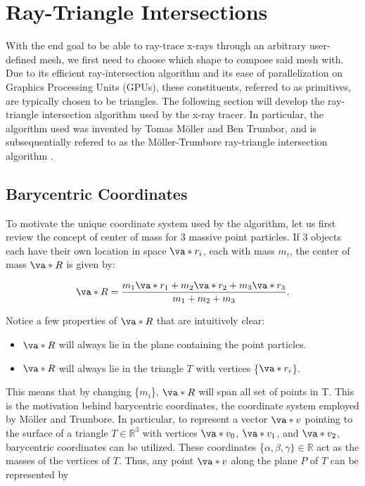 \section{Ray-Triangle Intersections}
\par With the end goal to be able to ray-trace x-rays through an arbitrary user-defined mesh, we first need to choose which shape to compose said mesh with. Due to its efficient ray-intersection algorithm and its ease of parallelization on Graphics Processing Units (GPUs), these constituents, referred to as primitives, are typically chosen to be triangles. The following section will develop the ray-triangle intersection algorithm used by the x-ray tracer. In particular, the algorithm used was invented by Tomas Möller and Ben Trumbor, and is subsequentially refered to as the Möller-Trumbore ray-triangle intersection algorithm \cite{moller2005fast}. 

\subsection{Barycentric Coordinates}
\par To motivate the unique coordinate system used by the algorithm, let us first review the concept of center of mass for 3 massive point particles. If 3 objects each have their own location in space $\va*{r_i}$, each with mass $m_i$, the center of mass $\va*{R}$ is given by:

\begin{equation}
  \va*{R} = \frac{m_1 \va*{r_1} + m_2 \va*{r_2} + m_3 \va*{r_3}}{m_1 + m_2 + m_3}.
  \label{eq:com}
\end{equation}

Notice a few properties of $\va*{R}$ that are intuitively clear:

\begin{itemize}
\item $\va*{R}$ will always lie in the plane containing the point particles.
\item $\va*{R}$ will always lie in the triangle $T$ with vertices \{$\va*{r_i}$\}.
\end{itemize}

\noindent This means that by changing \{$m_i$\}, $\va*{R}$ will span all set of points in T. This is the motivation behind barycentric coordinates, the coordinate system employed by Möller and Trumbore. In particular, to represent a vector $\va*{v}$ pointing to the surface of a triangle $T \in \mathbb{R}^3$ with vertices $\va*{v_0}$, $\va*{v_1}$, and $\va*{v_2}$, barycentric coordinates can be utilized. These coordinates \{$\alpha, \beta, \gamma\}\in \mathbb{R}$ act as the masses of the vertices of $T$. Thus, any point $\va*{v}$ along the plane $P$ of $T$ can be represented by 


